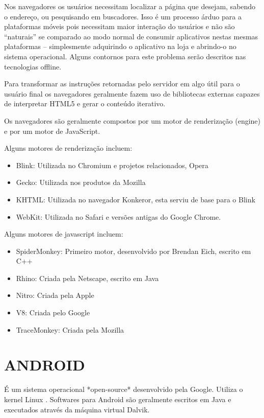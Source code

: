\documentclass[
12pt,
a4paper,
portuges,
draft
]{report}
\begin{document}
Nos navegadores os usuários necessitam localizar a página que desejam,
sabendo o endereço, ou pesquisando em buscadores. Isso é um processo
árduo para a plataformas móveis pois necessitam maior interação
do usuários e não são “naturais” se comparado ao modo normal
de consumir aplicativos nestas mesmas plataformas – simplesmente
adquirindo o aplicativo na loja e abrindo-o no sistema operacional.
Alguns contornos para este problema serão descritos nas tecnologias
offline.

Para transformar as instruções retornadas pelo servidor em algo útil
para o usuário final os navegadores geralmente fazem uso de bibliotecas
externas capazes de interpretar HTML5 e gerar o conteúdo iterativo.

Os navegadores são geralmente compostos por um motor de renderização (engine)
e por um motor de JavaScript.

Alguns motores de renderização incluem:

\begin{itemize}
    \item Blink: Utilizada no Chromium e projetos relacionados, Opera
    \item Gecko: Utilizada nos produtos da Mozilla
    \item KHTML: Utilizada no navegador Konkeror, esta serviu de base para o Blink
    \item WebKit: Utilizada no Safari e versões antigas do Google Chrome.
\end{itemize}

Alguns motores de javascript incluem:

\begin{itemize}
    \item SpiderMonkey: Primeiro motor, desenvolvido por Brendan Eich, escrito em C++
    \item Rhino: Criada pela Netscape, escrito em Java
    \item Nitro: Criada pela Apple
    \item V8: Criada pelo Google
    \item TraceMonkey: Criada pela Mozilla
\end{itemize}

\section{ANDROID}

É um sistema operacional *open-source* desenvolvido pela Google.
Utiliza o kernel Linux .
Softwares para Android são geralmente escritos em Java e executados
através da máquina virtual Dalvik.
\end{document}
